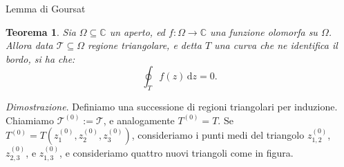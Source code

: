 \documentclass[11pt]{book}
\makeatletter
\theoremstyle{Definizione}
\theoremstyle{TeoremaProposizioneLemmaCorollarioCongettura}
\newtheorem{myteo}{Teorema}[section]
\theoremstyle{OsservazioneNotaEsempio}
\renewenvironment{proof}[1][\proofname]{\par
  \normalfont \topsep6\p@\@plus6\p@\relax
  \trivlist
  \item[\hskip\labelsep
        \itshape
    #1\@addpunct{.}]\ignorespaces
}{%
  \endtrivlist\@endpefalse
}
\renewenvironment{proof}{\textsl{Dimostrazione}.}{}
\newcommand{\C}{\mathbb{C}}
\renewcommand{\d}{\mathrm{d}}
\newcommand{\dz}{\,\d z}
\newcommand{\arrowIn}{
\tikz \draw[-latex] (-6pt,0) -- (6pt,0);
}
\newcommand{\arrowOut}{
\tikz \draw[stealth-] (-6pt,0) -- (6pt,0);
}
\makeatother
\begin{document}
\begin{boxteo}{Lemma di Goursat}
\begin{myteo}\label{teo:LemmaDiGoursat}
Sia $\Omega\subseteq \C$ un aperto, ed $f:\Omega\longrightarrow \C$ una funzione olomorfa su $\Omega$. Allora data $\mathscr{T}\subseteq \Omega$ regione triangolare, e detta $T$ una curva che ne identifica il bordo, si ha che:
$$
\oint_T f(z)\dz = 0.
$$
\end{myteo}
\tcblower
\begin{proof}
Definiamo una successione di regioni triangolari per induzione. Chiamiamo $\mathscr{T}^{(0)} := \mathscr{T}$, e analogamente $T^{(0)} = T$. Se $T^{(0)} = T(z_1^{(0)},z_2^{(0)},z_3^{(0)})$, consideriamo i punti medi del triangolo $z_{1,2}^{(0)}$, $z_{2,3}^{(0)}$, e $z_{1,3}^{(0)}$, e consideriamo quattro nuovi triangoli come in figura.
\begin{center}
\end{center}
\end{proof}
\end{boxteo}
\end{document}
